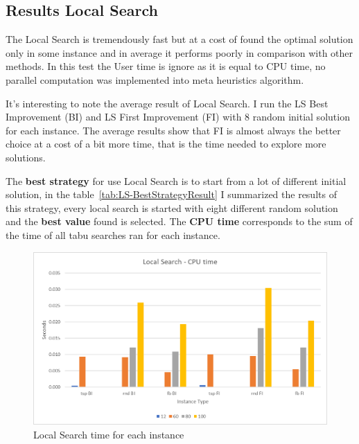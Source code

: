 	
	
\newpage
\subsection{Results Local Search}
	The Local Search is tremendously fast but at a cost of found the optimal solution only in some instance and in average it performs poorly in comparison with other methods. In this test the User time is ignore as it is equal to CPU time, no parallel computation was implemented into meta heuristics algorithm.

	It's interesting to note the average result of Local Search. I run the LS Best Improvement (BI) and LS First Improvement (FI) with 8 random initial solution for each instance. The average results show that FI is almost always the better choice at a cost of a bit more time, that is the time needed to explore more solutions.
	
	The \textbf{best strategy} for use Local Search is to start from a lot of different initial solution, in the table~\ref{tab:LS-BestStrategyResult} I summarized the results of this strategy, every local search is started with eight different random solution and the \textbf{best value} found is selected. The \textbf{CPU time} corresponds to the sum of the time of all tabu searches ran for each instance.
	
	\vspace{10pt}
	
	\begin{figure}[hb]
		\centering
		\includegraphics[width=\linewidth]{img/LS-time}
		\caption{Local Search time for each instance}
		\label{fig:ls-time}
	\end{figure}
	
